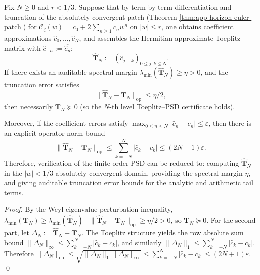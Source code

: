 \begin{theorem}\label{thm:xi-spectral-margin-finite-psd-certificate}
Fix \(N\ge 0\) and \(r<1/3\).
Suppose that by term-by-term differentiation and truncation of the absolutely convergent patch (Theorem \ref{thm:app-horizon-euler-patch}) for \(\mathscr{C}_{\zeta}(w)=c_0+2\sum_{n\ge 1}c_n w^n\) on \(|w|\le r\), one obtains coefficient approximations \(\widehat c_0,\dots,\widehat c_N\), and assembles the Hermitian approximate Toeplitz matrix with \(\widehat c_{-n}:=\overline{\widehat c_n}\):
\[
\widehat{\mathbf{T}}_N:=(\widehat c_{j-k})_{0\le j,k\le N}.
\]
If there exists an auditable spectral margin \(\lambda_{\min}(\widehat{\mathbf{T}}_N)\ge \eta>0\), and the truncation error satisfies
\[
\bigl\|\widehat{\mathbf{T}}_N-\mathbf{T}_N\bigr\|_{\mathrm{op}}\le \eta/2,
\]
then necessarily \(\mathbf{T}_N\succeq 0\) (so the \(N\)-th level Toeplitz--PSD certificate holds).
\par
Moreover, if the coefficient errors satisfy \(\max_{0\le n\le N}|\widehat c_n-c_n|\le \varepsilon\), then there is an explicit operator norm bound
\[
\bigl\|\widehat{\mathbf{T}}_N-\mathbf{T}_N\bigr\|_{\mathrm{op}}
\le \sum_{k=-N}^{N}|\widehat c_k-c_k|
\le (2N+1)\varepsilon.
\]
Therefore, verification of the finite-order PSD can be reduced to: computing \(\widehat{\mathbf{T}}_N\) in the \(|w|<1/3\) absolutely convergent domain, providing the spectral margin \(\eta\), and giving auditable truncation error bounds for the analytic and arithmetic tail terms.
\end{theorem}

\begin{proof}
By the Weyl eigenvalue perturbation inequality,
\(
\lambda_{\min}(\mathbf{T}_N)\ge \lambda_{\min}(\widehat{\mathbf{T}}_N)-\|\widehat{\mathbf{T}}_N-\mathbf{T}_N\|_{\mathrm{op}}
\ge \eta/2>0
\), so \(\mathbf{T}_N\succeq 0\).
For the second part, let \(\Delta_N:=\widehat{\mathbf{T}}_N-\mathbf{T}_N\).
The Toeplitz structure yields the row absolute sum bound
\(
\|\Delta_N\|_{\infty}\le \sum_{k=-N}^{N}|\widehat c_k-c_k|
\), and similarly \(\|\Delta_N\|_{1}\le \sum_{k=-N}^{N}|\widehat c_k-c_k|\).
Therefore
\(
\|\Delta_N\|_{\mathrm{op}}\le \sqrt{\|\Delta_N\|_1\|\Delta_N\|_\infty}\le \sum_{k=-N}^{N}|\widehat c_k-c_k|
\le (2N+1)\varepsilon
\).
\qed
\end{proof}

